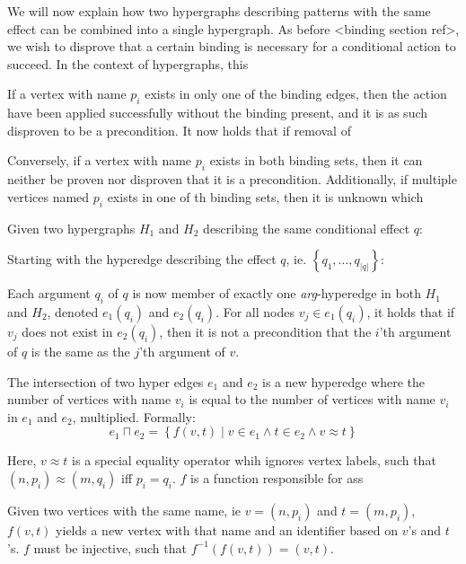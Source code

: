 \documentclass[../Master.tex]{subfiles}
\begin{document}
We will now explain how two hypergraphs describing patterns with the same effect can be combined into a single hypergraph. As before <binding section ref>, we wish to disprove that a certain binding is necessary for a conditional action to succeed. In the context of hypergraphs, this

If a vertex with name $p_i$ exists in only one of the binding edges, then the action have been applied successfully without the binding present, and it is as such disproven to be a precondition. It now holds that if removal of

Conversely, if a vertex with name $p_i$ exists in both binding sets, then it can neither be proven nor disproven that it is a precondition. Additionally, if multiple vertices named $p_i$ exists in one of th binding sets, then it is unknown which

Given two hypergraphs $H_1$ and $H_2$ describing the same conditional effect $q$:

Starting with the hyperedge describing the effect $q$, ie. $\left\{ q_1, \dots, q_{|q|}  \right\}$:

Each argument $q_i$ of $q$ is now member of exactly one \emph{arg}-hyperedge in  both $H_1$ and $H_2$, denoted $e_1(q_i)$ and $e_2(q_i)$. For all nodes $v_j \in e_1(q_i)$, it holds that  if $v_j$ does not exist in $e_2(q_i)$, then it is not a precondition that the $i$'th argument of $q$ is the same as the $j$'th argument of $v$.

\begin{definition}
    The intersection of two hyper edges $e_1$ and $e_2$ is a new hyperedge where the number of vertices with name $v_i$ is equal to the number of vertices with name $v_i$ in $e_1$ and $e_2$, multiplied. Formally:
    \begin{equation*}
        e_1 \sqcap e_2 = \left\{
            f(v, t) \; | \;
                v \in e_1 \land t \in e_2 \land v \approx t
        \right\}
    \end{equation*}

    Here, $v \approx t$ is a special equality operator whih ignores vertex labels, such that $\left( n, p_i \right) \approx \left( m, q_i \right)$ iff $p_i = q_i$. $f$ is a function responsible for ass
\end{definition}

\begin{definition}
    Given two vertices with the same name, ie $v = \left(n, p_i \right)$ and $t = \left( m, p_i \right)$, $f(v,t)$ yields a new vertex with that name and an identifier based on $v$'s and $t$'s. $f$ must be injective, such that $f^{-1}(f(v,t)) = (v,t)$.
\end{definition}
\end{document}
